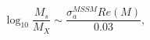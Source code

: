 \begin{equation}
\log_{10}\frac{M_s}{M_X} \sim \frac{\sigma^{MSSM}_a Re(M)}{0.03} ,
\end{equation}

